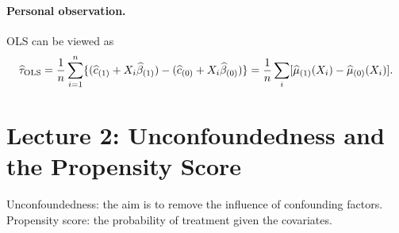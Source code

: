 \paragraph{Personal observation.}
OLS can be viewed as
\[
\widehat\tau_{\rm OLS}=\frac1n\sum_{i=1}^n
\{(\widehat c_{(1)}+X_i\widehat\beta_{(1)})
 -(\widehat c_{(0)}+X_i\widehat\beta_{(0)})\}
=\frac1n\sum_i[\widehat\mu_{(1)}(X_i)-\widehat\mu_{(0)}(X_i)].
\]

\section{Lecture 2: Unconfoundedness and the Propensity Score}
Unconfoundedness: the aim is to remove the influence of confounding factors. Propensity score: the probability of treatment given the covariates.
